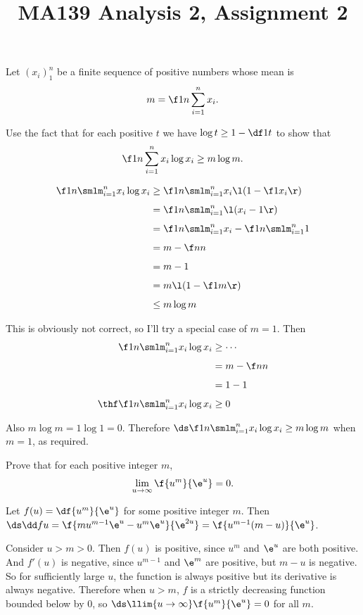 \documentclass[a4paper]{article}
\title{MA139 Analysis 2, Assignment 2}
\begin{document}
\maketitle

\setlength{\parindent}{0em}
\setlength{\parskip}{1em}


\begin{questionbody}
Let $(x_i)_1^n$ be a finite sequence of positive numbers whose mean is \[
m = \f1n \sum_{i=1}^n x_i.
\]

Use the fact that for each positive $t$ we have $\log t \ge 1 - \df1t$ to show that \[
\f1n \sum_{i=1}^n x_i \log x_i \ge m \log m.
\]
\end{questionbody}

\begin{align*}
\f1n \smlm_{i=1}^n x_i \log x_i &\ge \f1n \smlm_{i=1}^n x_i \l(1 - \f1{x_i}\r)\\[1ex]
&= \f1n \smlm_{i=1}^n \l(x_i - 1\r)\\[1ex]
&= \f1n \smlm_{i=1}^n x_i - \f1n \smlm_{i=1}^n 1\\[1ex]
&= m - \f nn\\[1ex]
&= m - 1\\[1ex]
&= m \l(1 - \f1m\r)\\[1ex]
&\le m \log m
\end{align*}

This is obviously not correct, so I'll try a special case of $m=1$. Then \begin{align*}
\f1n \smlm_{i=1}^n x_i \log x_i &\ge \cdots\\[1ex]
&= m - \f nn\\[1ex]
&= 1 - 1\\[1ex]
\thf \f1n \smlm_{i=1}^n x_i \log x_i &\ge 0
\end{align*}

Also $m \log m = 1 \log 1 = 0$. Therefore $\ds \f1n \smlm_{i=1}^n x_i \log x_i \ge m \log m$ when $m=1$, as required.


\begin{questionbody}
Prove that for each positive integer $m$, \[
\lim_{u \to \infty} \f{u^m}{\e^u} = 0.
\]
\end{questionbody}

Let $f(u) = \df{u^m}{\e^u}$ for some positive integer $m$. Then $\ds \dd fu = \f{m u^{m-1} \e^u - u^m \e^u}{\e^{2u}} = \f{u^{m-1} (m - u)}{\e^u}$.

Consider $u > m > 0$. Then $f(u)$ is positive, since $u^m$ and $\e^u$ are both positive. And $f'(u)$ is negative, since $u^{m-1}$ and $\e^m$ are positive, but $m - u$ is negative. So for sufficiently large $u$, the function is always positive but its derivative is always negative. Therefore when $u > m$, $f$ is a strictly decreasing function bounded below by $0$, so $\ds \llim{u \to \infty} \f{u^m}{\e^u} = 0$ for all $m$.
\end{document}
